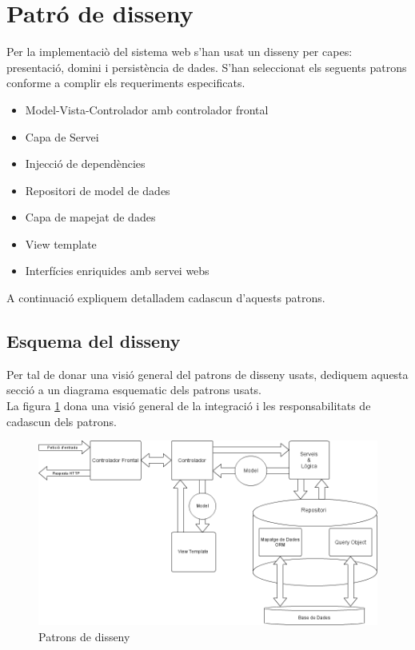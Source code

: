 \section{Patr\'{o} de disseny}
Per la implementaci\`{o} del sistema web s'han usat un disseny per capes: presentaci\'{o}, domini i persistència de dades. S'han seleccionat els seguents patrons conforme a complir els requeriments especificats.
  \begin{itemize}
  \item Model-Vista-Controlador amb controlador frontal
  \item Capa de Servei
  \item Injecci\'{o} de depend\`{e}ncies
  \item Repositori de model de dades
  \item Capa de mapejat de dades
  \item View template
  \item Interfícies enriquides amb servei webs
  \end{itemize}
A continuació expliquem detalladem cadascun d'aquests patrons.

\subsection{Esquema del disseny}
Per tal de donar una visió general del patrons de disseny usats, dediquem aquesta secció a un diagrama esquematic dels patrons usats.\\

La figura \ref{fig:dessignpatters} dona una visió general de la integració i les responsabilitats de cadascun dels patrons.
\begin{figure}[H]
  \includegraphics[scale=0.5]{img/design/IchnaeaPatterns.png}
  \caption{Patrons de disseny}
  \label{fig:dessignpatters}
\end{figure}

